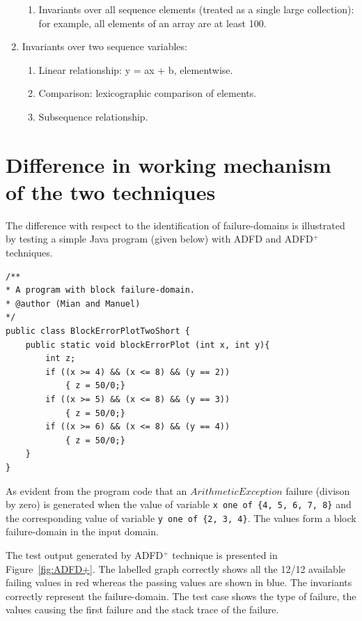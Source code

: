 \begin{enumerate}
\begin{enumerate}
	\item Invariants over all sequence elements (treated as a single large collection): for example, all elements of an array are at least 100.
	\end{enumerate}
\item Invariants over two sequence variables: 
	\begin{enumerate}
	\item Linear relationship: y = ax + b, elementwise. 
	\item Comparison: lexicographic comparison of elements. 
	\item Subsequence relationship.
	\end{enumerate}
\end{enumerate}








\section{Difference in working mechanism of the two techniques}
The difference with respect to the identification of failure-domains is illustrated by testing a simple Java program (given below) with ADFD and ADFD$^+$ techniques. 
\bigskip
\begin{lstlisting}
/** 
* A program with block failure-domain.
* @author (Mian and Manuel)
*/
public class BlockErrorPlotTwoShort {
	public static void blockErrorPlot (int x, int y){
		int z;
		if ((x >= 4) && (x <= 8) && (y == 2))
			{ z = 50/0;}
		if ((x >= 5) && (x <= 8) && (y == 3))
			{ z = 50/0;}
		if ((x >= 6) && (x <= 8) && (y == 4))
			{ z = 50/0;}
	}
}
\end{lstlisting}
\bigskip


As evident from the program code that an $ArithmeticException$ failure (divison by zero) is generated when the value of variable \verb+x one of {4, 5, 6, 7, 8}+ and the corresponding value of variable \verb+y one of {2, 3, 4}+. The values form a block failure-domain in the input domain.

The test output generated by ADFD$^+$ technique is presented in Figure~\ref{fig:ADFD+}. The labelled graph correctly shows all the 12/12 available failing values in red whereas the passing values are shown in blue. The invariants correctly represent the failure-domain. The test case shows the type of failure, the values causing the first failure and the stack trace of the failure.

